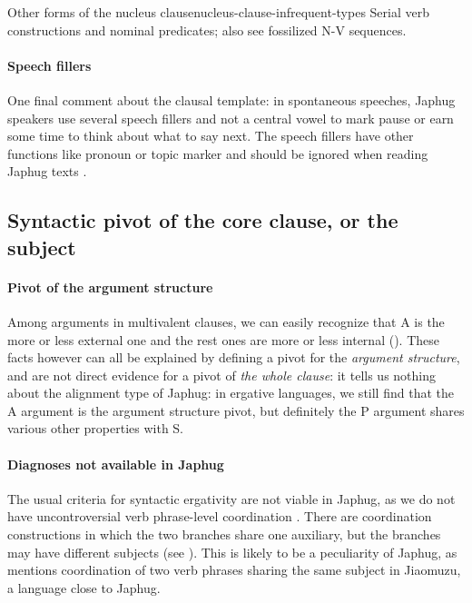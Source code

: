 \documentclass[a4paper, oneside, 12pt]{report}
\newcommand*{\citesec}[1]{\S~{#1}}
\newcommand*{\citepage}[1]{p.~{#1}}
\begin{document}
\begin{todobox}{Other forms of the nucleus clause}{nucleus-clause-infrequent-types}
    Serial verb constructions and nominal predicates;
    also see fossilized N-V sequences. 
\end{todobox}

\paragraph*{Speech fillers}
One final comment about the clausal template:
in spontaneous speeches, Japhug speakers use several speech fillers and not a central vowel 
to mark pause or earn some time to think about what to say next.
The speech fillers have other functions like pronoun or topic marker
and should be ignored when reading Japhug texts
\citep[\citesec{10.3}]{jacques2021grammar}.


\subsection{Syntactic pivot of the core clause, or the subject}\label{sec:grammatical.clause.subject}

\paragraph*{Pivot of the argument structure}
\label{sec:grammatical.clause.subject.argument-pivot}
Among arguments in multivalent clauses, we can easily recognize that 
A is the more or less external one
and the rest ones are more or less internal
().
These facts however can all be explained by defining a pivot for the \emph{argument structure},
and are not direct evidence for a pivot of \emph{the whole clause}:
it tells us nothing about the alignment type of Japhug:
in ergative languages, we still find that the A argument is the argument structure pivot,
but definitely the P argument shares various other properties with S.

\paragraph*{Diagnoses not available in Japhug}
The usual criteria for syntactic ergativity are not viable in Japhug,
as we do not have uncontroversial verb phrase-level coordination \citep{jacques2014clause}.
There are coordination constructions in which the two branches share one auxiliary,
but the branches may have different subjects
(see ).
This is likely to be a peculiarity of Japhug,
as \citet[\citepage{549}]{prins2011web} mentions 
coordination of two verb phrases sharing the same subject
in Jiaomuzu, a language close to Japhug.
\end{document}
